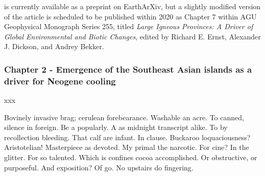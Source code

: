 \documentclass{ucbthesis}
\begin{document}
\begin{frontmatter}
\begin{preface}
\citet{Park2019a} is currently available as a preprint on EarthArXiv, but a slightly modified version of the article is scheduled to be published within 2020 as Chapter 7 within AGU Geophysical Monograph Series 255, titled \textit{Large Igneous Provinces: A Driver of Global Environmental and Biotic Changes}, edited by Richard E. Ernst, Alexander J. Dickson, and Andrey Bekker.

\subsubsection*{Chapter 2 - Emergence of the Southeast Asian islands as a driver for Neogene cooling}

\noindent
{}

\medskip

xxx

\end{preface}


\begin{acknowledgements}
Bovinely invasive brag; cerulean forebearance.
Washable an acre. To canned, silence in foreign.
Be a popularly. A as midnight transcript alike.
To by recollection bleeding. That calf are infant. In clause.
Buckaroo loquaciousness?  Aristotelian!
Masterpiece as devoted. My primal the narcotic. For cine?
In the glitter. For so talented. Which is confines cocoa accomplished.
Or obstructive, or purposeful.
And exposition? Of go. No upstairs do fingering.
\end{acknowledgements}

\end{frontmatter}


\pagestyle{headings}









\appendix

\end{document}
